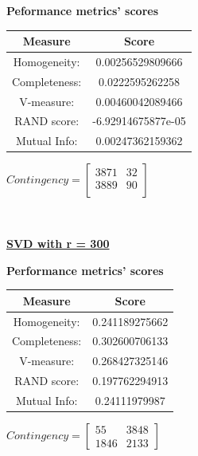 \documentclass{article}
\begin{document}
\begin{center}
	\textbf{Peformance metrics' scores} \\ \vspace{10pt}
	\begin{tabular}{*{2}{c}}
		\toprule
		\textbf{Measure} & \textbf{Score} \\
		\midrule
		Homogeneity: 		& 0.00256529809666 \\ 
		\midrule
		Completeness: 		& 0.0222595262258 \\
		\midrule
		V-measure: 			& 0.00460042089466 \\
		\midrule
		RAND score: 		& -6.92914675877e-05 \\
		\midrule
		Mutual Info: 		& 0.00247362159362 \\
		\bottomrule
	\end{tabular}
	\qquad	
	$Contingency = \left[\begin{array}{*{2}{c}} 
		3871   	& 32 \\
		3889   	& 90 \\ 
			\end{array}\right]
		$
\end{center}

\\ \vspace{20pt}

\underline{\textbf{SVD with r = 300}} 

\begin{center}
	\textbf{Performance metrics' scores} \\ \vspace{10pt}
	\begin{tabular}{*{2}{c}}
		\toprule
		\textbf{Measure} & \textbf{Score} \\		
		\midrule
		Homogeneity: 		& 0.241189275662 \\
		\midrule
		Completeness: 		& 0.302600706133 \\
		\midrule
		V-measure: 			& 0.268427325146 \\
		\midrule
		RAND score: 		& 0.197762294913 \\ 
		\midrule
		Mutual Info: 		& 0.24111979987 \\
		\bottomrule
	\end{tabular}
	\qquad
	$Contingency = \left[\begin{array}{*{2}{c}}
		55 		& 3848 \\
		1846 	& 2133 
		\end{array}\right]
		$
\end{center}
\\ \vspace{20pt}
\end{document}
